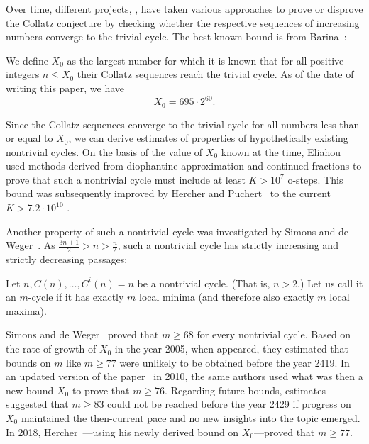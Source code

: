 \documentclass[12pt,reqno]{article}
\begin{document}
Over time, different projects, \cite{LV,Roosendaal,TOS,TOS2,He,He2,Barina}, have taken various approaches to prove or disprove the Collatz conjecture by checking whether the respective sequences of increasing numbers converge to the trivial cycle. The best known bound is from Barina~\cite{Barina-www}:

\begin{definition}\label{Definition8}
We define $X_0$ as the largest number for which it is known that for all positive integers $n\leq X_0$ their Collatz sequences reach the trivial cycle. As of the date of writing this paper, we have
\[X_0=695 \cdot 2^{60}.\]
\end{definition}

Since the Collatz sequences converge to the trivial cycle for all numbers
less than or equal to $X_0$,  we can derive estimates of properties of
hypothetically existing nontrivial cycles. On the basis of the 
value of $X_0$ known at the time,  Eliahou~\cite{SE} used methods derived from
diophantine approximation and continued fractions to prove that such a
nontrivial cycle must include at least $K>10^7$ o-steps. This bound was
subsequently improved by Hercher and Puchert~\cite{He,He2,Pu} to the
current  $K>7.2\cdot 10^{10}$ .

Another property of such a nontrivial cycle was investigated by Simons
and de Weger~\cite{SW}. As $\tfrac{3n+1}{2}>n>\tfrac{n}{2}$, such a
nontrivial cycle has strictly increasing and strictly decreasing passages:
\begin{definition}
Let $n, C(n), \ldots, C^i(n)=n$ be a nontrivial cycle. (That is, $n>2$.) Let us call it an $m$-cycle if it has exactly $m$ local minima (and therefore also exactly $m$ local maxima). 
\end{definition}

Simons and de Weger~\cite{SW} proved that $m\geq 68$ for
every nontrivial cycle. Based on the rate of growth of $X_0$ in the year
2005, when \cite{SW} appeared, they estimated that bounds on $m$ like
$m\geq 77$ were unlikely to be obtained before the
year 2419. In an updated version of the paper~\cite{SW-www} in 2010,
the same authors used what was then
a new bound $X_0$ to prove that $m \geq 76$. Regarding future bounds,
estimates suggested that $m\geq 83$ could not be reached before the year
2429 if progress on $X_0$ maintained the then-current pace and no new
insights into the topic emerged. In 2018, Hercher~\cite{He,He2}---using
his newly derived bound on $X_0$---proved that $m \geq 77$.
\end{document}
